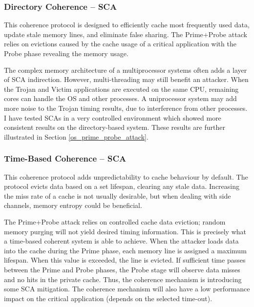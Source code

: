 		\subsubsection{Directory Coherence -- SCA}
			This coherence protocol is designed to efficiently cache most frequently used data, update stale memory lines, and eliminate false sharing. The Prime+Probe attack relies on evictions caused by the cache usage of a critical application with the Probe phase revealing the memory usage.
			
			
			The complex memory architecture of a multiprocessor systems often adds a layer of SCA indirection. However, multi-threading may still benefit an attacker. When the Trojan and Victim applications are executed on the same CPU, remaining cores can handle the OS and other processes. A uniprocessor system may add more noise to the Trojan timing results, due to interference from other processes. I have tested SCAs in a very controlled environment which showed more consistent results on the directory-based system. These results are further illustrated in Section \ref{os_prime_probe_attack}.
		
		\subsubsection{Time-Based Coherence -- SCA}	
			This coherence protocol adds unpredictability to cache behaviour by default. The protocol evicts data based on a set lifespan, clearing any stale data. Increasing the miss rate of a cache is not usually desirable, but when dealing with side channels, memory entropy could be beneficial.
			
			The Prime+Probe attack relies on controlled cache data eviction; random memory purging will not yield desired timing information. This is precisely what a time-based coherent system is able to achieve. When the attacker loads data into the cache during the Prime phase, each memory line is assigned a maximum lifespan. When this value is exceeded, the line is evicted. If sufficient time passes between the Prime and Probe phases, the Probe stage will observe data misses and no hits in the private cache. Thus, the coherence mechanism is introducing some SCA mitigation. The coherence mechanism will also have a low performance impact on the critical application (depends on the selected time-out).
			
